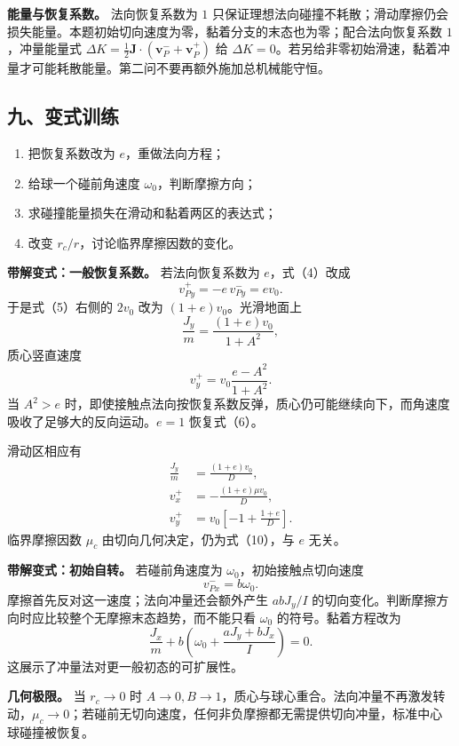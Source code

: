 \documentclass[12pt,a4paper,UTF8]{ctexart}
\newcommand{\tightlist}{\setlength{\itemsep}{0pt}\setlength{\parskip}{0pt}}
\begin{document}
\textbf{能量与恢复系数。} 法向恢复系数为 \(1\)
只保证理想法向碰撞不耗散；滑动摩擦仍会损失能量。本题初始切向速度为零，黏着分支的末态也为零；配合法向恢复系数
\(1\)，冲量能量式 \(\Delta K=\tfrac12\bm J\cdot(\bm v_P^-+\bm v_P^+)\)
给
\(\Delta K=0\)。若另给非零初始滑速，黏着冲量才可能耗散能量。第二问不要再额外施加总机械能守恒。

\subsection{九、变式训练}\label{ux4e5dux53d8ux5f0fux8badux7ec3-3}

\begin{enumerate}
\def\labelenumi{\arabic{enumi}.}
\tightlist
\item
  把恢复系数改为 \(e\)，重做法向方程；
\item
  给球一个碰前角速度 \(\omega_0\)，判断摩擦方向；
\item
  求碰撞能量损失在滑动和黏着两区的表达式；
\item
  改变 \(r_c/r\)，讨论临界摩擦因数的变化。
\end{enumerate}

\textbf{带解变式：一般恢复系数。} 若法向恢复系数为 \(e\)，式（4）改成 \[
v_{Py}^+=-e\,v_{Py}^-=ev_0.
\] 于是式（5）右侧的 \(2v_0\) 改为 \((1+e)v_0\)。光滑地面上 \[
\frac{J_y}{m}
=\frac{(1+e)v_0}{1+A^2},
\] 质心竖直速度 \[
\boxed{
v_y^+
=v_0\frac{e-A^2}{1+A^2}
}. \tag{16}
\] 当 \(A^2>e\)
时，即使接触点法向按恢复系数反弹，质心仍可能继续向下，而角速度吸收了足够大的反向运动。\(e=1\)
恢复式（6）。

滑动区相应有 \[
\begin{aligned}
\frac{J_y}{m}
&=\frac{(1+e)v_0}{D},\\
v_x^+&=-\frac{(1+e)\mu v_0}{D},\\
v_y^+&=v_0\left[-1+\frac{1+e}{D}\right].
\end{aligned} \tag{17}
\] 临界摩擦因数 \(\mu_c\) 由切向几何决定，仍为式（10），与 \(e\) 无关。

\textbf{带解变式：初始自转。} 若碰前角速度为
\(\omega_0\)，初始接触点切向速度 \[
v_{Px}^-=b\omega_0.
\] 摩擦首先反对这一速度；法向冲量还会额外产生 \(abJ_y/I\)
的切向变化。判断摩擦方向时应比较整个无摩擦末态趋势，而不能只看
\(\omega_0\) 的符号。黏着方程改为 \[
\frac{J_x}{m}+b\left(\omega_0+\frac{aJ_y+bJ_x}{I}\right)=0.
\tag{18}
\] 这展示了冲量法对更一般初态的可扩展性。

\textbf{几何极限。} 当 \(r_c\to0\) 时
\(A\to0,B\to1\)，质心与球心重合。法向冲量不再激发转动，\(\mu_c\to0\)；若碰前无切向速度，任何非负摩擦都无需提供切向冲量，标准中心球碰撞被恢复。
\end{document}

